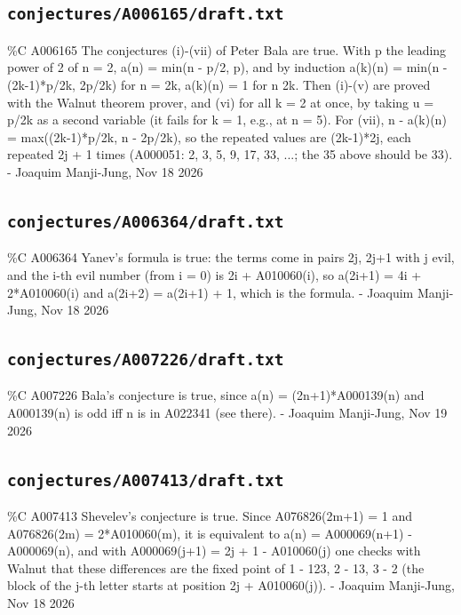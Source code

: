 \subsection*{\texttt{conjectures/A006165/draft.txt}}
{\small\raggedright\ttfamily
\%C A006165 The conjectures (i)-(vii) of Peter Bala are true. With p the leading power of 2 of n = 2, a(n) = min(n - p/2, p), and by induction a(k)(n) = min(n - (2k-1)*p/2k, 2p/2k) for n = 2k, a(k)(n) = 1 for n  2k. Then (i)-(v) are proved with the Walnut theorem prover, and (vi) for all k = 2 at once, by taking u = p/2k as a second variable (it fails for k = 1, e.g., at n = 5). For (vii), n - a(k)(n) = max((2k-1)*p/2k, n - 2p/2k), so the repeated values are (2k-1)*2j, each repeated 2j + 1 times (A000051: 2, 3, 5, 9, 17, 33, ...; the 35 above should be 33). - Joaquim Manji-Jung, Nov 18 2026\par
}
\subsection*{\texttt{conjectures/A006364/draft.txt}}
{\small\raggedright\ttfamily
\%C A006364 Yanev's formula is true: the terms come in pairs 2j, 2j+1 with j evil, and the i-th evil number (from i = 0) is 2i + A010060(i), so a(2i+1) = 4i + 2*A010060(i) and a(2i+2) = a(2i+1) + 1, which is the formula. - Joaquim Manji-Jung, Nov 18 2026\par
}
\subsection*{\texttt{conjectures/A007226/draft.txt}}
{\small\raggedright\ttfamily
\%C A007226 Bala's conjecture is true, since a(n) = (2n+1)*A000139(n) and A000139(n) is odd iff n is in A022341 (see there). - Joaquim Manji-Jung, Nov 19 2026\par
}
\subsection*{\texttt{conjectures/A007413/draft.txt}}
{\small\raggedright\ttfamily
\%C A007413 Shevelev's conjecture is true. Since A076826(2m+1) = 1 and A076826(2m) = 2*A010060(m), it is equivalent to a(n) = A000069(n+1) - A000069(n), and with A000069(j+1) = 2j + 1 - A010060(j) one checks with Walnut that these differences are the fixed point of 1 - 123, 2 - 13, 3 - 2 (the block of the j-th letter starts at position 2j + A010060(j)). - Joaquim Manji-Jung, Nov 18 2026\par
}
